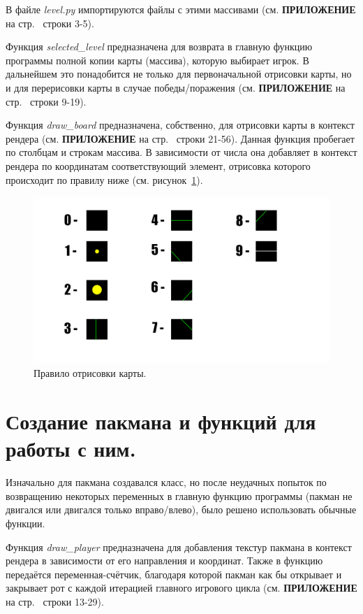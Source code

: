 В файле \textit{level.py} импортируются файлы с этими массивами (см. \textbf{\textsc{ПРИЛОЖЕНИЕ}} на стр.~\pageref{code:level} строки 3-5).

Функция \textit{selected\_level} предназначена для возврата в главную функцию программы полной копии карты (массива), которую выбирает игрок. В дальнейшем это понадобится не только для первоначальной отрисовки карты, но и для перерисовки карты в случае победы/поражения (см. \textbf{\textsc{ПРИЛОЖЕНИЕ}} на стр.~\pageref{code:level} строки 9-19).

Функция \textit{draw\_board} предназначена, собственно, для отрисовки карты в контекст рендера (см. \textbf{\textsc{ПРИЛОЖЕНИЕ}} на стр.~\pageref{code:level} строки 21-56). Данная функция пробегает по столбцам и строкам массива. В зависимости от числа она добавляет в контекст рендера по координатам соответствующий элемент, отрисовка которого происходит по правилу ниже (см. рисунок~\ref{fig1}).
\begin{figure}[H]
	\centering
	\includegraphics[width=1\linewidth]{images/карта.png}
	\caption{Правило отрисовки карты.}
	\label{fig1}
\end{figure}

\section{\label{sec:ch02/sec01/sub05}Создание пакмана и функций для работы с ним.}
Изначально для пакмана создавался класс, но после неудачных попыток по возвращению некоторых переменных в главную функцию программы (пакман не двигался или двигался только вправо/влево), было решено использовать обычные функции.

Функция \textit{draw\_player} предназначена для добавления текстур пакмана в контекст рендера в зависимости от его направления и координат. Также в функцию передаётся переменная-счётчик, благодаря которой пакман как бы открывает и закрывает рот с каждой итерацией главного игрового цикла (см. \textbf{\textsc{ПРИЛОЖЕНИЕ}} на стр.~\pageref{code:player} строки 13-29).

